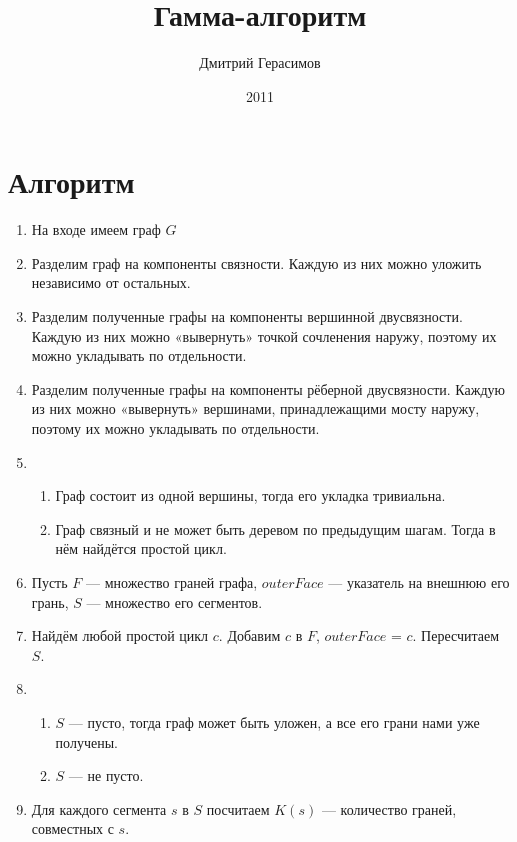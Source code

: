 \documentclass[a4paper, 10pt]{article}
\begin{document}
\title{Гамма-алгоритм}
\author{Дмитрий Герасимов}
\date{2011}

\maketitle
\tableofcontents

\section{Алгоритм}

\begin{enumerate}
    \item На входе имеем граф $G$
    \item Разделим граф на компоненты связности. Каждую из них
          можно уложить независимо от остальных.
    \item Разделим полученные графы на компоненты вершинной
          двусвязности. Каждую из них можно «вывернуть» точкой
          сочленения наружу, поэтому их можно укладывать по
          отдельности.
    \item Разделим полученные графы на компоненты рёберной
          двусвязности. Каждую из них можно «вывернуть» вершинами,
          принадлежащими мосту наружу, поэтому их можно укладывать
          по отдельности.
    \item 
          \begin{enumerate}
          \item Граф состоит из одной вершины, тогда его укладка тривиальна.
          \item Граф связный и не может быть деревом по предыдущим шагам.
                Тогда в нём найдётся простой цикл.
          \end{enumerate}
    \item Пусть $F$ — множество граней графа, $outerFace$ — указатель на внешнюю его грань, $S$ — множество его сегментов.
    \item Найдём любой простой цикл $c$. Добавим $c$ в $F$, $outerFace$ = $c$. Пересчитаем $S$.
    \item
          \begin{enumerate}
          \item $S$ — пусто, тогда граф может быть уложен, а все его грани нами уже получены.
          \item $S$ — не пусто.
          \end{enumerate}
    \item Для каждого сегмента $s$ в $S$ посчитаем $K(s)$ — количество граней, совместных с $s$.

\end{enumerate}
\end{document}
